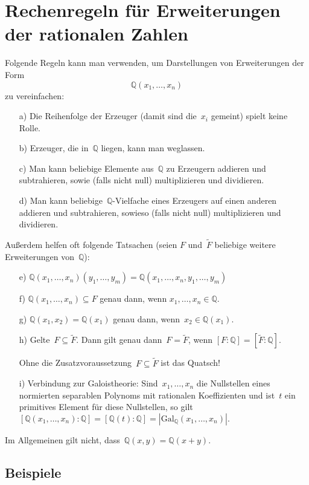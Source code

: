 \documentclass[12pt,a4paper,ngerman]{scrartcl}
\newcommand{\QQ}{\mathbb{Q}}
\theoremstyle{definition}
\theoremstyle{plain}
\theoremstyle{remark}
\begin{document}
\section*{Rechenregeln für Erweiterungen der rationalen Zahlen}

Folgende Regeln kann man verwenden, um Darstellungen von Erweiterungen der
Form
\[ \QQ(x_1,\ldots,x_n) \] zu vereinfachen:
\begin{enumerate}
\item[a)] Die Reihenfolge der Erzeuger (damit sind die~$x_i$ gemeint) spielt keine Rolle.
\item[b)] Erzeuger, die in~$\QQ$ liegen, kann man weglassen.
\item[c)] Man kann beliebige Elemente aus~$\QQ$ zu Erzeugern addieren und
subtrahieren, sowie (falls nicht null) multiplizieren und dividieren.
\item[d)] Man kann beliebige~$\QQ$-Vielfache eines Erzeugers auf einen anderen
addieren und subtrahieren, sowieso (falls nicht null) multiplizieren und
dividieren.
\end{enumerate}

Außerdem helfen oft folgende Tatsachen (seien $F$ und~$\widetilde F$ beliebige
weitere Erweiterungen von~$\QQ$):
\begin{enumerate}
\item[e)] $\QQ(x_1,\ldots,x_n)(y_1,\ldots,y_m) = \QQ(x_1,\ldots,x_n,y_1,\ldots,y_m)$
\item[f)] $\QQ(x_1,\ldots,x_n) \subseteq F$ genau dann, wenn
$x_1,\ldots,x_n \in \QQ$.
\item[g)] $\QQ(x_1,x_2) = \QQ(x_1)$ genau dann, wenn~$x_2 \in \QQ(x_1)$.
\item[h)] Gelte~$F \subseteq \widetilde F$. Dann gilt genau dann~$F =
\widetilde F$, wenn $[F:\QQ] = [\widetilde F:\QQ]$.

Ohne die Zusatzvoraussetzung~$F \subseteq \widetilde F$ ist das Quatsch!
\item[i)] Verbindung zur Galoistheorie: Sind~$x_1,\ldots,x_n$ die Nullstellen
eines normierten separablen Polynoms mit rationalen Koeffizienten und ist~$t$
ein primitives Element für diese Nullstellen, so
gilt~$[\QQ(x_1,\ldots,x_n):\QQ] = [\QQ(t):\QQ] =
|\mathrm{Gal}_\QQ(x_1,\ldots,x_n)|.$
\end{enumerate}
Im Allgemeinen gilt nicht, dass~$\QQ(x,y) = \QQ(x+y)$.

\subsection*{Beispiele}
\end{document}
